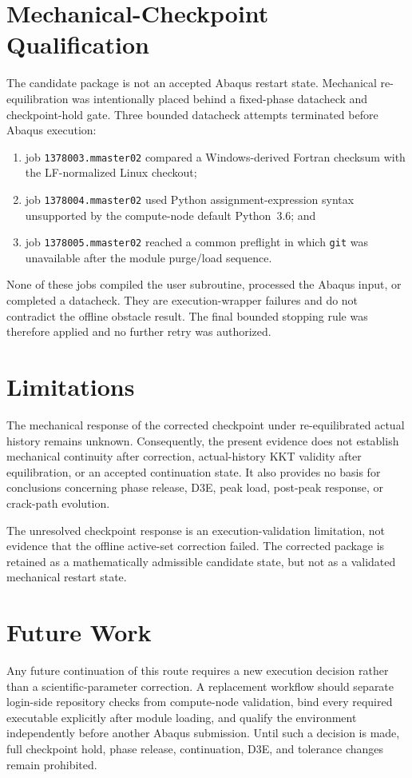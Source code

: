 \section{Mechanical-Checkpoint Qualification}

The candidate package is not an accepted Abaqus restart state.  Mechanical
re-equilibration was intentionally placed behind a fixed-phase datacheck and
checkpoint-hold gate.  Three bounded datacheck attempts terminated before
Abaqus execution:

\begin{enumerate}
  \item job \texttt{1378003.mmaster02} compared a Windows-derived Fortran
        checksum with the LF-normalized Linux checkout;
  \item job \texttt{1378004.mmaster02} used Python assignment-expression
        syntax unsupported by the compute-node default Python~3.6; and
  \item job \texttt{1378005.mmaster02} reached a common preflight in which
        \texttt{git} was unavailable after the module purge/load sequence.
\end{enumerate}

None of these jobs compiled the user subroutine, processed the Abaqus input, or
completed a datacheck.  They are execution-wrapper failures and do not
contradict the offline obstacle result.  The final bounded stopping rule was
therefore applied and no further retry was authorized.

\section{Limitations}

The mechanical response of the corrected checkpoint under re-equilibrated
actual history remains unknown.  Consequently, the present evidence does not
establish mechanical continuity after correction, actual-history KKT validity
after equilibration, or an accepted continuation state.  It also provides no
basis for conclusions concerning phase release, D3E, peak load, post-peak
response, or crack-path evolution.

The unresolved checkpoint response is an execution-validation limitation, not
evidence that the offline active-set correction failed.  The corrected package
is retained as a mathematically admissible candidate state, but not as a
validated mechanical restart state.

\section{Future Work}

Any future continuation of this route requires a new execution decision rather
than a scientific-parameter correction.  A replacement workflow should
separate login-side repository checks from compute-node validation, bind every
required executable explicitly after module loading, and qualify the
environment independently before another Abaqus submission.  Until such a
decision is made, full checkpoint hold, phase release, continuation, D3E, and
tolerance changes remain prohibited.
